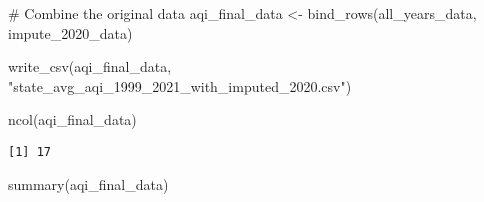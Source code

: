 \documentclass[
  12pt,
]{article}
\newenvironment{Shaded}{\begin{snugshade}}{\end{snugshade}}
\newcommand{\CommentTok}[1]{\textcolor[rgb]{0.37,0.37,0.37}{#1}}
\newcommand{\FunctionTok}[1]{\textcolor[rgb]{0.28,0.35,0.67}{#1}}
\newcommand{\NormalTok}[1]{\textcolor[rgb]{0.00,0.23,0.31}{#1}}
\newcommand{\OtherTok}[1]{\textcolor[rgb]{0.00,0.23,0.31}{#1}}
\newcommand{\StringTok}[1]{\textcolor[rgb]{0.13,0.47,0.30}{#1}}
\begin{document}
\begin{Shaded}
\begin{Highlighting}[]
\CommentTok{\# Combine the original data }
\NormalTok{aqi\_final\_data }\OtherTok{\textless{}{-}} \FunctionTok{bind\_rows}\NormalTok{(all\_years\_data, impute\_2020\_data)}

\FunctionTok{write\_csv}\NormalTok{(aqi\_final\_data, }\StringTok{"state\_avg\_aqi\_1999\_2021\_with\_imputed\_2020.csv"}\NormalTok{)}
\end{Highlighting}
\end{Shaded}

\begin{Shaded}
\begin{Highlighting}[]
\FunctionTok{ncol}\NormalTok{(aqi\_final\_data)}
\end{Highlighting}
\end{Shaded}

\begin{verbatim}
[1] 17
\end{verbatim}

\begin{Shaded}
\begin{Highlighting}[]
\FunctionTok{summary}\NormalTok{(aqi\_final\_data)}
\end{Highlighting}
\end{Shaded}
\end{document}
